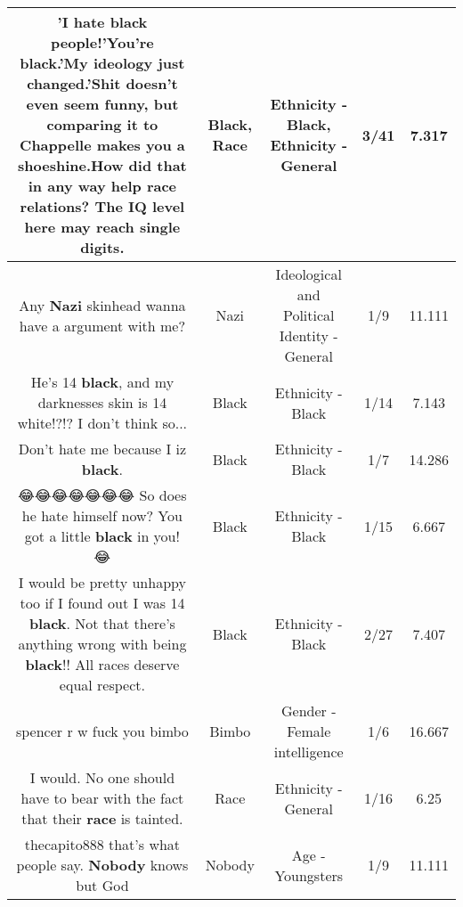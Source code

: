 \documentclass[11pt]{article}
\newlength\mylength
\begin{document}
\begin{center}
\begin{longtable}{|C{.65\mylength}|C{.30\mylength}|C{.12\mylength}|C{.12\mylength}|C{.12\mylength}|}
  \small 'I hate \textbf{black} people!'You're \textbf{black}.'My ideology just changed.'Shit doesn't even seem funny, but comparing it to Chappelle makes you a shoeshine.How did that in any way help \textbf{race} relations? The IQ level here may reach single digits.\normalsize   & Black, Race & Ethnicity - Black, Ethnicity - General & 3/41 & 7.317 \\  \hline
  \small Any \textbf{Nazi} skinhead wanna have a argument with me?\normalsize   & Nazi &  Ideological and Political Identity - General & 1/9 & 11.111 \\  \hline
  \small He's 14 \textbf{black}, and my darknesses skin is 14 white!?!? I don't think so...\normalsize   & Black & Ethnicity - Black & 1/14 & 7.143 \\  \hline
  \small Don't hate me because I iz \textbf{black}.\normalsize   & Black & Ethnicity - Black & 1/7 & 14.286 \\  \hline
  \small 😂😂😂😂😂😂😂 So does he hate himself now? You got a little \textbf{black} in you! 😂\normalsize   & Black & Ethnicity - Black & 1/15 & 6.667 \\  \hline
  \small I would be pretty unhappy too if I found out I was 14 \textbf{black}. Not that there's anything wrong with being \textbf{black}!! All races deserve equal respect.\normalsize   & Black & Ethnicity - Black & 2/27 & 7.407 \\  \hline
  \small spencer r w fuck you bimbo\normalsize   & Bimbo & Gender - Female intelligence & 1/6 & 16.667 \\  \hline
  \small I would. No one should have to bear with the fact that their \textbf{race} is tainted.\normalsize   & Race & Ethnicity - General & 1/16 & 6.25 \\  \hline
  \small thecapito888 that's what people say. \textbf{Nobody} knows but God\normalsize   & Nobody & Age - Youngsters & 1/9 & 11.111 \\  \hline

\end{longtable}
\end{center}
\end{document}
